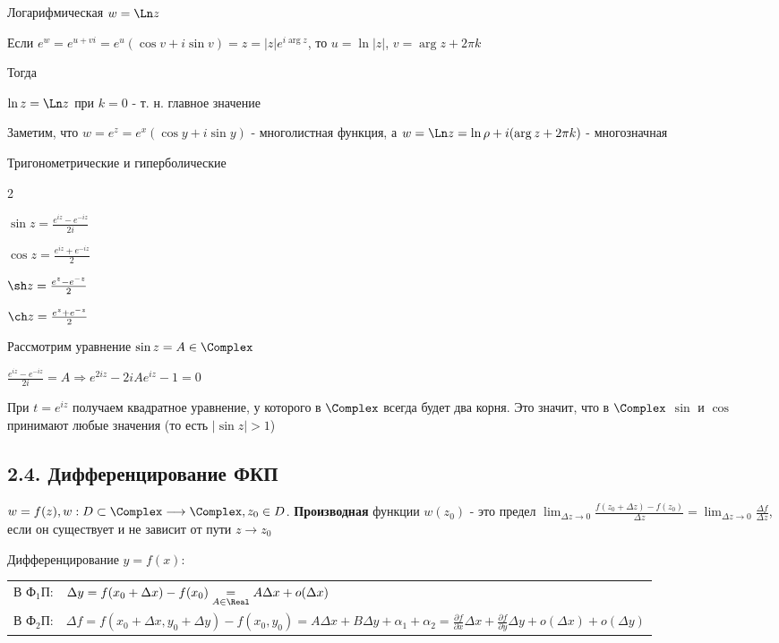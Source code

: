 \documentclass[12pt]{article}
\begin{document}
 Логарифмическая $w = \Ln z$

Если $e^w = e^{u + vi} = e^u (\cos v + i \sin v) = z = |z| e^{i\arg z}$, то $u = \ln |z|$, $v = \arg z + 2\pi k$

Тогда 

$\ln z = \Ln z$ при $k = 0$ - т. н. главное значение






Заметим, что $w = e^z = e^x (\cos y + i \sin y)$ - многолистная функция, а $w = \Ln z = \ln \rho + i (\arg z + 2\pi k)$ - многозначная

 Тригонометрические и гиперболические

\begin{multicols}{2}
    \begin{center}
        $\sin z = \frac{e^{iz} - e^{-iz}}{2i}$

        $\cos z = \frac{e^{iz} + e^{-iz}}{2}$

        $\sh z = \frac{e^{z} - e^{-z}}{2}$

        $\ch z = \frac{e^{z} + e^{-z}}{2}$
    \end{center}
\end{multicols}

\Nota Рассмотрим уравнение $\sin z = A \in \Complex$

$\frac{e^{iz} - e^{-iz}}{2i} = A \Longrightarrow e^{2iz} - 2iAe^{iz} - 1 = 0$

При $t = e^{iz}$ получаем квадратное уравнение, у которого в $\Complex$ всегда будет два корня. 
Это значит, что в $\Complex$ $\sin$ и $\cos$ принимают любые значения (то есть $|\sin z| > 1$)

\subsection{2.4. Дифференцирование ФКП}

\Def $w = f(z), w : D \subset \Complex \longrightarrow \Complex, z_0 \in D$. \textbf{Производная} функции
$w(z_0)$ - это предел $\lim_{\Delta z \to 0} \frac{f(z_0 + \Delta z) - f(z_0)}{\Delta z} = \lim_{\Delta z \to 0} \frac{\Delta f}{\Delta z}$, 
если он существует и не зависит от пути $z \to z_0$

\Mem Дифференцирование $y = f(x)$:

\begin{tabular}{ll}
    В Ф$_1$П: & $\Delta y = f(x_0 + \Delta x) - f(x_0) \underset{A \in \Real}{=} A\Delta x + o(\Delta x)$ \\
    В Ф$_2$П: & $\Delta f = f(x_0 + \Delta x, y_0 + \Delta y) - f(x_0, y_0) = A\Delta x + B \Delta y + \alpha_1 + \alpha_2 = 
    \frac{\partial f}{\partial x} \Delta x + \frac{\partial f}{\partial y} \Delta y + o(\Delta x) + o(\Delta y)$
\end{tabular}
\end{document}
